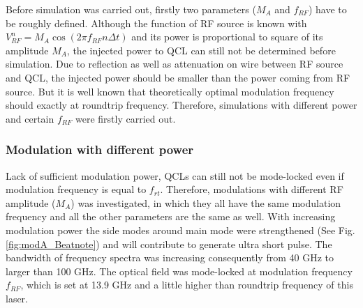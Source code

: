 \documentclass[11pt,final]{scrbook}
\begin{document}
Before simulation was carried out, firstly two parameters ($M_{A}$ and $f_{RF}$) have to be roughly defined. Although the function of RF source is known with $V_{RF}^{n}=M_{A}\cos(2\pi f_{RF}n\Delta t)$ and its power is proportional to square of its amplitude $M_{A}$, the injected power to QCL can still not be determined before simulation. Due to reflection as well as attenuation on wire between RF source and QCL, the injected power should be smaller than the power coming from RF source. But it is well known that theoretically optimal modulation frequency should exactly at roundtrip frequency. Therefore, simulations with different power and certain $f_{RF}$ were firstly carried out.
\subsubsection{Modulation with different power} 
Lack of sufficient modulation power, QCLs can still not be mode-locked even if modulation frequency is equal to $f_{rt}$. Therefore, modulations with different RF amplitude ($M_{A}$) was investigated, in which they all have the same modulation frequency and all the other parameters are the same as well. With increasing modulation power the side modes around main mode were strengthened (See Fig. \ref{fig:modA_Beatnote}) and will contribute to generate ultra short pulse. The bandwidth of frequency spectra was increasing consequently from 40 GHz to larger than 100 GHz. The optical field was mode-locked at modulation frequency $f_{RF}$, which is set at 13.9 GHz and a little higher than roundtrip frequency of this laser. 
\end{document}
